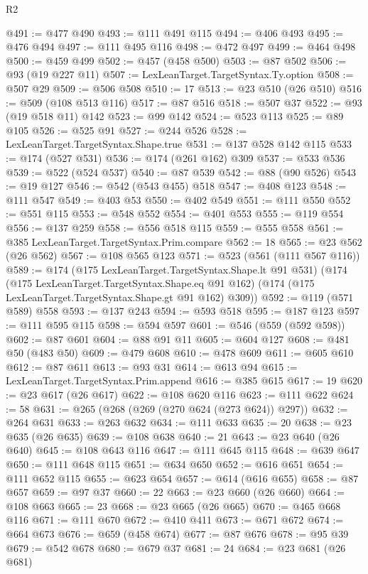 \begin{lexlean}{R2}
\begin{coremodule}
{{{{{{{{{{{{{{{{{{{{{{{{{{{{{{{{{{{{{{{{{{{{{{{{{{{{{{{{{{{{{{{{{{{{{{{{{{{{{{{{{{{{{{{{{{{{{{{{{{{{{{{{{{{{{{{{{{{{{{{{{{{{{{{{{{{{{{{{{{{{@491 := @477 @490
@493 := @111 @491 @115
@494 := @406 @493
@495 := @476 @494
@497 := @111 @495 @116
@498 := @472 @497
@499 := @464 @498
@500 := @459 @499
@502 := @457 (@458 @500)
@503 := @87 @502
@506 := @93 (@19 @227 @11)
@507 := LexLeanTarget.TargetSyntax.Ty.option
@508 := @507 @29
@509 := @506 @508
@510 := 17
@513 := @23 @510 (@26 @510)
@516 := @509 (@108 @513 @116)
@517 := @87 @516
@518 := @507 @37
@522 := @93 (@19 @518 @11) @142
@523 := @99 @142
@524 := @523 @113
@525 := @89 @105
@526 := @525 @91
@527 := @244 @526
@528 := LexLeanTarget.TargetSyntax.Shape.true
@531 := @137 @528 @142 @115
@533 := @174 (@527 @531)
@536 := @174 (@261 @162) @309
@537 := @533 @536
@539 := @522 (@524 @537)
@540 := @87 @539
@542 := @88 (@90 @526)
@543 := @19 @127
@546 := @542 (@543 @455) @518
@547 := @408 @123
@548 := @111 @547
@549 := @403 @53
@550 := @402 @549
@551 := @111 @550
@552 := @551 @115
@553 := @548 @552
@554 := @401 @553
@555 := @119 @554
@556 := @137 @259
@558 := @556 @518 @115
@559 := @555 @558
@561 := @385 LexLeanTarget.TargetSyntax.Prim.compare
@562 := 18
@565 := @23 @562 (@26 @562)
@567 := @108 @565 @123
@571 := @523 (@561 (@111 @567 @116))
@589 := @174
    (@175 LexLeanTarget.TargetSyntax.Shape.lt @91 @531)
    (@174
      (@175 LexLeanTarget.TargetSyntax.Shape.eq @91 @162)
      (@174 (@175 LexLeanTarget.TargetSyntax.Shape.gt @91 @162) @309))
@592 := @119 (@571 @589) @558
@593 := @137 @243
@594 := @593 @518
@595 := @187 @123
@597 := @111 @595 @115
@598 := @594 @597
@601 := @546 (@559 (@592 @598))
@602 := @87 @601
@604 := @88 @91 @11
@605 := @604 @127
@608 := @481 @50 (@483 @50)
@609 := @479 @608
@610 := @478 @609
@611 := @605 @610
@612 := @87 @611
@613 := @93 @31
@614 := @613 @94
@615 := LexLeanTarget.TargetSyntax.Prim.append
@616 := @385 @615
@617 := 19
@620 := @23 @617 (@26 @617)
@622 := @108 @620 @116
@623 := @111 @622
@624 := 58
@631 := @265 (@268 (@269 (@270 @624 (@273 @624)) @297))
@632 := @264 @631
@633 := @263 @632
@634 := @111 @633
@635 := 20
@638 := @23 @635 (@26 @635)
@639 := @108 @638
@640 := 21
@643 := @23 @640 (@26 @640)
@645 := @108 @643 @116
@647 := @111 @645 @115
@648 := @639 @647
@650 := @111 @648 @115
@651 := @634 @650
@652 := @616 @651
@654 := @111 @652 @115
@655 := @623 @654
@657 := @614 (@616 @655)
@658 := @87 @657
@659 := @97 @37
@660 := 22
@663 := @23 @660 (@26 @660)
@664 := @108 @663
@665 := 23
@668 := @23 @665 (@26 @665)
@670 := @465 @668 @116
@671 := @111 @670
@672 := @410 @411
@673 := @671 @672
@674 := @664 @673
@676 := @659 (@458 @674)
@677 := @87 @676
@678 := @95 @39
@679 := @542 @678
@680 := @679 @37
@681 := 24
@684 := @23 @681 (@26 @681)
}}}}}}}}}}}}}}}}}}}}}}}}}}}}}}}}}}}}}}}}}}}}}}}}}}}}}}}}}}}}}}}}}}}}}}}}}}}}}}}}}}}}}}}}}}}}}}}}}}}}}}}}}}}}}}}}}}}}}}}}}}}}}}}}}}}}}}}}}}}}
\end{coremodule}
\end{lexlean}
